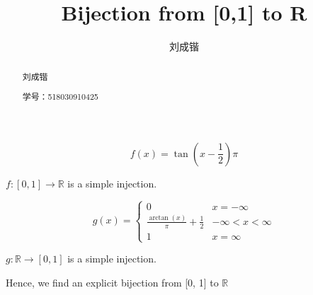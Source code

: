 \documentclass{ximera}
\title{Bijection from [0,1] to R}
\author{刘成锴}
\begin{document}
	
\begin{abstract}
	
	刘成锴
	
	学号：518030910425
\end{abstract}
\maketitle

	
\begin{solution}
	$$
	f(x) = \tan({x - \frac{1}{2}})\pi
	$$
	
	$f:[0, 1] \rightarrow \mathbb{R}$ is a simple injection.
	
	$$
	g(x)=\left\{
	\begin{array}{lc}
	0 & x = -\infty \\ 
	\frac{\arctan(x)}{\pi} + \frac{1}{2} & -\infty < x < \infty \\ 
	1 & x = \infty
	\end{array}\right.
	$$
	
	$g:\mathbb{R} \rightarrow [0, 1]$ is a simple injection.
	
	Hence, we find an explicit bijection from [0, 1] to $\mathbb{R}$
\end{solution}
	
\end{document}
